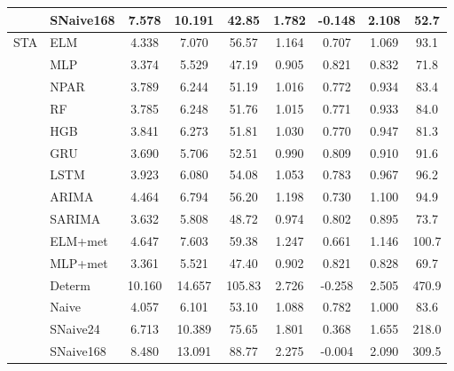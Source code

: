 \begin{table}[H]
{\begin{tabular}{llccccccc}
 & SNaive168 & 7.578 & 10.191 & 42.85 & 1.782 & -0.148 & 2.108 & 52.7 \\
\midrule
STA & ELM & 4.338 & 7.070 & 56.57 & 1.164 & 0.707 & 1.069 & 93.1 \\
 & MLP & 3.374 & 5.529 & 47.19 & 0.905 & 0.821 & 0.832 & 71.8 \\
 & NPAR & 3.789 & 6.244 & 51.19 & 1.016 & 0.772 & 0.934 & 83.4 \\
 & RF & 3.785 & 6.248 & 51.76 & 1.015 & 0.771 & 0.933 & 84.0 \\
 & HGB & 3.841 & 6.273 & 51.81 & 1.030 & 0.770 & 0.947 & 81.3 \\
 & GRU & 3.690 & 5.706 & 52.51 & 0.990 & 0.809 & 0.910 & 91.6 \\
 & LSTM & 3.923 & 6.080 & 54.08 & 1.053 & 0.783 & 0.967 & 96.2 \\
 & ARIMA & 4.464 & 6.794 & 56.20 & 1.198 & 0.730 & 1.100 & 94.9 \\
 & SARIMA & 3.632 & 5.808 & 48.72 & 0.974 & 0.802 & 0.895 & 73.7 \\
 & ELM+met & 4.647 & 7.603 & 59.38 & 1.247 & 0.661 & 1.146 & 100.7 \\
 & MLP+met & 3.361 & 5.521 & 47.40 & 0.902 & 0.821 & 0.828 & 69.7 \\
 & Determ & 10.160 & 14.657 & 105.83 & 2.726 & -0.258 & 2.505 & 470.9 \\
 & Naive & 4.057 & 6.101 & 53.10 & 1.088 & 0.782 & 1.000 & 83.6 \\
 & SNaive24 & 6.713 & 10.389 & 75.65 & 1.801 & 0.368 & 1.655 & 218.0 \\
 & SNaive168 & 8.480 & 13.091 & 88.77 & 2.275 & -0.004 & 2.090 & 309.5 \\
\bottomrule
\end{tabular}}
\end{table}
